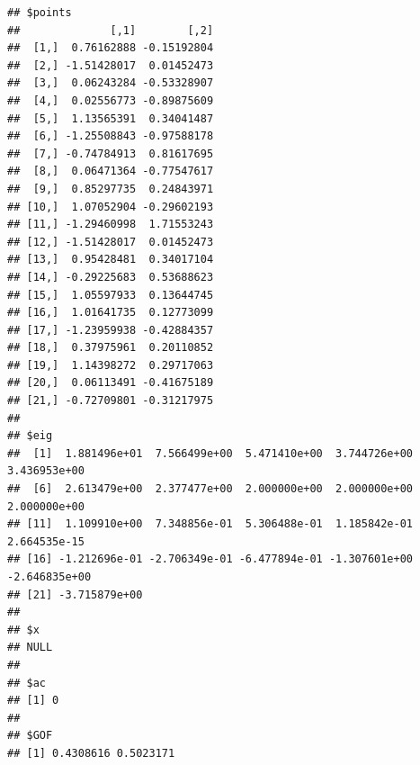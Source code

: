 \documentclass[
  notitlepage,
  onecolumn,
  openany]{book}
\newenvironment{Shaded}{\begin{snugshade}}{\end{snugshade}}
\newcommand{\AttributeTok}[1]{\textcolor[rgb]{0.77,0.63,0.00}{#1}}
\newcommand{\CommentTok}[1]{\textcolor[rgb]{0.56,0.35,0.01}{\textit{#1}}}
\newcommand{\ConstantTok}[1]{\textcolor[rgb]{0.00,0.00,0.00}{#1}}
\newcommand{\DecValTok}[1]{\textcolor[rgb]{0.00,0.00,0.81}{#1}}
\newcommand{\FunctionTok}[1]{\textcolor[rgb]{0.00,0.00,0.00}{#1}}
\newcommand{\NormalTok}[1]{#1}
\newcommand{\OtherTok}[1]{\textcolor[rgb]{0.56,0.35,0.01}{#1}}
\newcommand{\SpecialCharTok}[1]{\textcolor[rgb]{0.00,0.00,0.00}{#1}}
\newcommand{\StringTok}[1]{\textcolor[rgb]{0.31,0.60,0.02}{#1}}
\begin{document}
\begin{Shaded}
\end{Shaded}

\begin{verbatim}
## $points
##              [,1]        [,2]
##  [1,]  0.76162888 -0.15192804
##  [2,] -1.51428017  0.01452473
##  [3,]  0.06243284 -0.53328907
##  [4,]  0.02556773 -0.89875609
##  [5,]  1.13565391  0.34041487
##  [6,] -1.25508843 -0.97588178
##  [7,] -0.74784913  0.81617695
##  [8,]  0.06471364 -0.77547617
##  [9,]  0.85297735  0.24843971
## [10,]  1.07052904 -0.29602193
## [11,] -1.29460998  1.71553243
## [12,] -1.51428017  0.01452473
## [13,]  0.95428481  0.34017104
## [14,] -0.29225683  0.53688623
## [15,]  1.05597933  0.13644745
## [16,]  1.01641735  0.12773099
## [17,] -1.23959938 -0.42884357
## [18,]  0.37975961  0.20110852
## [19,]  1.14398272  0.29717063
## [20,]  0.06113491 -0.41675189
## [21,] -0.72709801 -0.31217975
## 
## $eig
##  [1]  1.881496e+01  7.566499e+00  5.471410e+00  3.744726e+00  3.436953e+00
##  [6]  2.613479e+00  2.377477e+00  2.000000e+00  2.000000e+00  2.000000e+00
## [11]  1.109910e+00  7.348856e-01  5.306488e-01  1.185842e-01  2.664535e-15
## [16] -1.212696e-01 -2.706349e-01 -6.477894e-01 -1.307601e+00 -2.646835e+00
## [21] -3.715879e+00
## 
## $x
## NULL
## 
## $ac
## [1] 0
## 
## $GOF
## [1] 0.4308616 0.5023171
\end{verbatim}

\begin{Shaded}
\end{Shaded}
\end{document}

